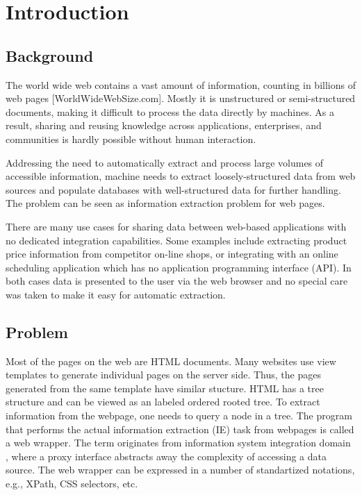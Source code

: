 \chapter{Introduction}


\section{Background} %
\label{sec:Problem}


The world wide web contains a vast amount of information, counting in billions of web pages [WorldWideWebSize.com]. Mostly it is unstructured or semi-structured documents, making it difficult to process the data directly by machines. As a result, sharing and reusing knowledge across applications, enterprises, and communities is hardly possible without human interaction.

Addressing the need to automatically extract and process large volumes of accessible information, machine needs to extract loosely-structured data from web sources and populate databases with well-structured data for further handling. The problem can be seen as information extraction problem for web pages. 

There are many use cases for sharing data between web-based applications with no dedicated integration capabilities. Some examples include extracting product price information from competitor on-line shops, or integrating with an online scheduling application which has no application programming interface (API). In both cases data is presented to the user via the web browser and no special care was taken to make it easy for automatic extraction.


\section{Problem}


Most of the pages on the web are HTML documents. Many websites use view templates to generate individual pages on the server side. Thus, the pages generated from the same template have similar stucture. HTML has a tree structure and can be viewed as an labeled ordered rooted tree. To extract information from the webpage, one needs to query a node in a tree. The program that performs the actual information extraction (IE) task from webpages is called a web wrapper. The term originates from information system integration domain \cite{Chang:2006:SWI:1159162.1159300}, where a proxy interface abstracts away the complexity of accessing a data source. The web wrapper can be expressed in a number of standartized notations, e.g., XPath, CSS selectors, etc.

